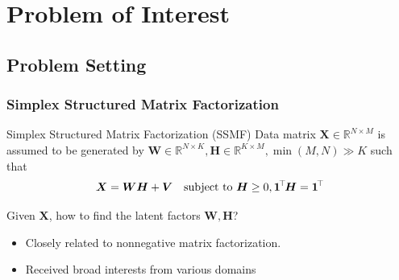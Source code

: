 \documentclass[10pt,xcolor={usenames,dvipsnames,table}]{beamer}
\def\blue{\color{blue}}
\newcommand{\T}{\!\top\!}
\newcommand{\citep}[1]{{\blue \scriptsize \parencite{#1}}}
\begin{document}
\section{Problem of Interest}%

\subsection{Problem Setting}%
\label{sub:separable_nmf}


\begin{frame}
    \frametitle{Simplex Structured Matrix Factorization}

    {
    \begin{block}{Simplex Structured Matrix Factorization (SSMF)}
    Data matrix $\bm{X} \in \mathbb{R}^{N \times M}$ is assumed to be generated by $\bm{W} \in \mathbb{R}^{N \times K}, \bm{H} \in \mathbb{R}^{K \times M}, \min(M, N) \gg K$  such that
    \[
    \bm{X} = \bm{W} \bm{H} + \bm{V} \quad \text{\rm subject to } \bm{H} \geq 0 , \bm{1}^{\T}\bm{H} = \bm{1}^{\T}
    \] 
    \end{block}}
    \begin{block}
        
    Given $\bm{X}$, how to find the latent factors $\bm{W}, \bm{H}$?
    \end{block}
    \begin{itemize}
        \item Closely related to nonnegative matrix factorization.
            
\item Received broad interests from various domains \citep{keshava2002spectral,CANMS,arora2012practical,arora2012learning,recht2012factoring,mao2017mixed,panov2018consistent,huang2019detecting,fu2016robust}
    \end{itemize}



\end{frame}
\end{document}
